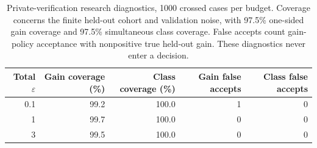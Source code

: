 \begin{table}[t]
\caption{Private-verification research diagnostics, 1000 crossed cases per budget. Coverage concerns the finite held-out cohort and validation noise, with 97.5\% one-sided gain coverage and 97.5\% simultaneous class coverage. False accepts count gain-policy acceptance with nonpositive true held-out gain. These diagnostics never enter a decision.}
\label{tab:validation-coverage}\small
\centering
\begin{tabular}{@{}rrrrr@{}}\toprule
Total $\varepsilon$ & Gain coverage (\%) & Class coverage (\%) & Gain false accepts & Class false accepts \\
\midrule
0.1 & 99.2 & 100.0 & 1 & 0 \\
1 & 99.7 & 100.0 & 0 & 0 \\
3 & 99.5 & 100.0 & 0 & 0 \\
\bottomrule\end{tabular}
\end{table}
